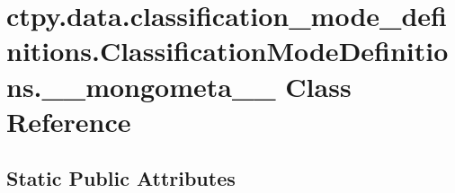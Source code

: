 \hypertarget{classctpy_1_1data_1_1classification__mode__definitions_1_1_classification_mode_definitions_1_1____mongometa____}{\section{ctpy.\-data.\-classification\-\_\-mode\-\_\-definitions.\-Classification\-Mode\-Definitions.\-\_\-\-\_\-mongometa\-\_\-\-\_\- Class Reference}
\label{classctpy_1_1data_1_1classification__mode__definitions_1_1_classification_mode_definitions_1_1____mongometa____}
}
\subsection*{Static Public Attributes}
